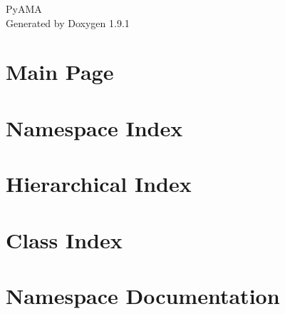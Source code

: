 \let\mypdfximage\pdfximage\def\pdfximage{\immediate\mypdfximage}\documentclass[twoside]{book}
\newcommand{\+}{\discretionary{\mbox{\scriptsize$\hookleftarrow$}}{}{}}
\newcommand{\clearemptydoublepage}{%
  \newpage{\pagestyle{empty}\cleardoublepage}%
}
\begin{document}
\raggedbottom

\hypersetup{pageanchor=false,
             bookmarksnumbered=true,
             pdfencoding=unicode
            }
\begin{titlepage}
\vspace*{7cm}
\begin{center}%
{\Large Py\+AMA }\\
\vspace*{1cm}
{\large Generated by Doxygen 1.9.1}\\
\end{center}
\end{titlepage}
\clearemptydoublepage
{}
\tableofcontents
\clearemptydoublepage
{}
\hypersetup{pageanchor=true}

\chapter{Main Page}
\label{index}\hypertarget{index}{}
\chapter{Namespace Index}

\chapter{Hierarchical Index}

\chapter{Class Index}

\chapter{Namespace Documentation}




\end{document}
